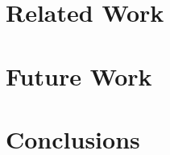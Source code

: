 \documentclass[journal]{IEEEtran}
\begin{document}
\section{Related Work}



\section{Future Work}



\section{Conclusions}





\ifCLASSOPTIONcaptionsoff
  \newpage
\fi

%
%
\end{document}
